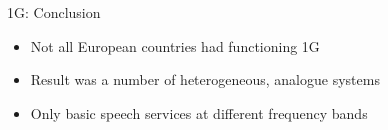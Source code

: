\begin{frame}{1G: Conclusion}
  \begin{itemize}  
    \item Not all European countries had functioning 1G \cite{Gess2002}
    \item Result was a number of heterogeneous, analogue systems
    \item Only basic speech services at different frequency bands
  \end{itemize}
\end{frame}
